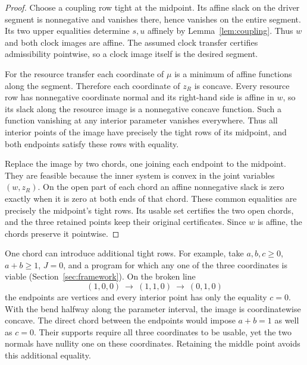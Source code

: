 \begin{proof}
Choose a coupling row tight at the midpoint. Its affine slack on the
driver segment is nonnegative and vanishes there, hence vanishes on
the entire segment. Its two upper equalities determine \(s,u\)
affinely by Lemma~\ref{lem:coupling}. Thus \(w\) and both clock
images are affine. The assumed clock transfer certifies admissibility
pointwise, so a clock image itself is the desired segment.

For the resource transfer each coordinate of \(\mu\) is a minimum of
affine functions along the segment. Therefore each coordinate of
\(z_R\) is concave. Every resource row has nonnegative coordinate
normal and its right-hand side is affine in \(w\), so its slack along
the resource image is a nonnegative concave function. Such a function
vanishing at any interior parameter vanishes everywhere. Thus all
interior points of the image have precisely the tight rows of its
midpoint, and both endpoints satisfy these rows with equality.

Replace the image by two chords, one joining each endpoint to the
midpoint. They are feasible because the inner system is convex in
the joint variables \((w,z_R)\). On the open part of each chord an
affine nonnegative slack is zero exactly when it is zero at both
ends of that chord. These common equalities are precisely the
midpoint's tight rows. Its usable set certifies the two open chords,
and the three retained points keep their original certificates.
Since \(w\) is affine, the chords preserve it pointwise.
\end{proof}

One chord can introduce additional tight rows. For example, take
\(a,b,c\ge0\), \(a+b\ge1\), \(J=0\), and a program for which any
one of the three coordinates is viable
(Section~\ref{sec:framework}). On the broken line
\[
               (1,0,0)\ \longrightarrow\ (1,1,0)\
                         \longrightarrow\ (0,1,0)
\]
the endpoints are vertices and every interior point has only the
equality \(c=0\). With the bend halfway along the parameter interval,
the image is coordinatewise concave. The direct chord between the
endpoints would impose \(a+b=1\) as well as \(c=0\). Their supports
require all three coordinates to be usable, yet the two normals have
nullity one on these coordinates. Retaining the middle point avoids
this additional equality.

